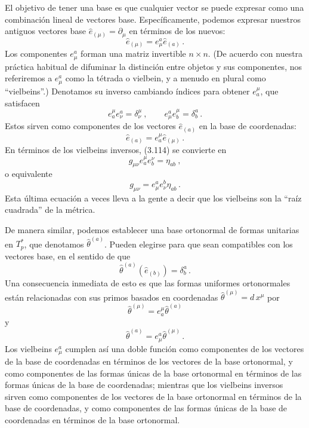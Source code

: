 \documentclass[11pt,b5paper,openany,twoside]{book}
\newcommand{\e}[1]{\hat{e}_{(#1)}}
\newcommand{\ztheta}[1]{{\hat{\theta}}^{(#1)}}
\newcommand{\p}[1]{{\partial_{#1}}}
\begin{document}
El objetivo de tener una base es que cualquier vector se puede expresar como una combinación lineal de vectores base.
Específicamente, podemos expresar nuestros antiguos vectores base $\e\mu = \p\mu$ en términos de los nuevos:
\begin{equation}
\e\mu = e^a_\mu\e{a}\,.\label{3.115}
\end{equation}
Los componentes $e^a_\mu$ forman una matriz invertible $n\times n$.
(De acuerdo con nuestra práctica habitual de difuminar la distinción entre objetos y sus componentes, nos referiremos a $e^a_\mu$ como la tétrada o vielbein, y a menudo en plural como ``vielbeins''.) Denotamos su inverso cambiando índices para obtener $e^\mu_a$, que satisfacen
\begin{equation}
e^\mu_a e^a_\nu=\delta^\mu_\nu\ ,\qquad
e^a_\mu e^\mu_b = \delta^a_b\,.\label{3.116}
\end{equation}
Estos sirven como componentes de los vectores $\e{a}$ en la base de coordenadas:
\begin{equation}
\e{a} = e^\mu_a \e\mu\,.\label{3.117}
\end{equation}
En términos de los vielbeins inversos, (3.114) se convierte en
\begin{equation}
g_{\mu\nu} e^\mu_a e^\nu_b = \eta_{ab}\ ,\label{3.118}
\end{equation}
o equivalente
\begin{equation}
g_{\mu\nu} = e_\mu^a e_\nu^b \eta_{ab}\,.\label{3.119}
\end{equation}
Esta última ecuación a veces lleva a la gente a decir que los vielbeins son la ``raíz cuadrada'' de la métrica.

De manera similar, podemos establecer una base ortonormal de formas unitarias en $T^*_p$, que denotamos $ \ztheta{a}$.
Pueden elegirse para que sean compatibles con los vectores base, en el sentido de que
\begin{equation}
 \ztheta{a}(\e{b}) = \delta^a_b\,.\label{3.120}
\end{equation}
Una consecuencia inmediata de esto es que las formas uniformes ortonormales están relacionadas con sus primos basados en coordenadas $ \ztheta{\mu} =  d\,x^\mu$ por
\begin{equation}
 \ztheta{\mu} = e^\mu_a  \ztheta{a}\label{3.121}
\end{equation}
y
\begin{equation}
 \ztheta{a} = e^a_\mu  \ztheta{\mu}\,.\label{3.122}
\end{equation}
Los vielbeins $e^a_\mu$ cumplen así una doble función como componentes de los vectores de la base de coordenadas en términos de los vectores de la base ortonormal, y como componentes de las formas únicas de la base ortonormal en términos de las formas únicas de la base de coordenadas; mientras que los vielbeins inversos sirven como componentes de los vectores de la base ortonormal en términos de la base de coordenadas, y como componentes de las formas únicas de la base de coordenadas en términos de la base ortonormal.
\end{document}
